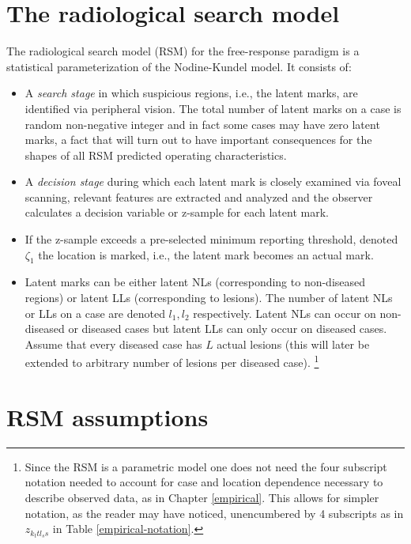 \documentclass[
]{book}
\begin{document}
\hypertarget{rsm-details}{%
\section{The radiological search model}\label{rsm-details}}

The radiological search model (RSM) for the free-response paradigm is a statistical parameterization of the Nodine-Kundel model. It consists of:

\begin{itemize}
\item
  A \emph{search stage} in which suspicious regions, i.e., the latent marks, are identified via peripheral vision. The total number of latent marks on a case is random non-negative integer and in fact some cases may have zero latent marks, a fact that will turn out to have important consequences for the shapes of all RSM predicted operating characteristics.
\item
  A \emph{decision stage} during which each latent mark is closely examined via foveal scanning, relevant features are extracted and analyzed and the observer calculates a decision variable or z-sample for each latent mark.
\item
  If the z-sample exceeds a pre-selected minimum reporting threshold, denoted \(\zeta_1\) the location is marked, i.e., the latent mark becomes an actual mark.
\item
  Latent marks can be either latent NLs (corresponding to non-diseased regions) or latent LLs (corresponding to lesions). The number of latent NLs or LLs on a case are denoted \(l_1, l_2\) respectively. Latent NLs can occur on non-diseased or diseased cases but latent LLs can only occur on diseased cases. Assume that every diseased case has \(L\) actual lesions (this will later be extended to arbitrary number of lesions per diseased case). \footnote{Since the RSM is a parametric model one does not need the four subscript notation needed to account for case and location dependence necessary to describe observed data, as in Chapter \ref{empirical}. This allows for simpler notation, as the reader may have noticed, unencumbered by 4 subscripts as in \(z_{k_ttl_ss}\) in Table \ref{empirical-notation}.}
\end{itemize}

\hypertarget{rsm-assumptions}{%
\section{RSM assumptions}\label{rsm-assumptions}}
\end{document}
